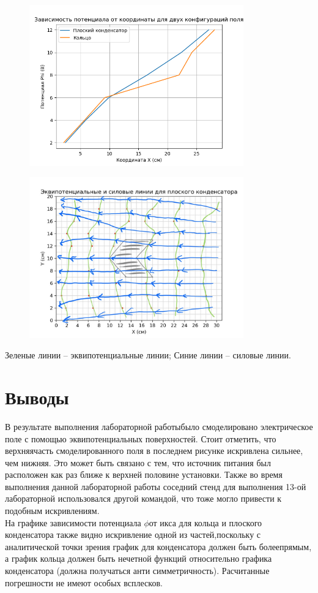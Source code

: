 \documentclass{article}%
\begin{document}
\begin{figure}[h!]%
\centering%
\includegraphics[width=350px]{2_potentials.png}%
\newpage%
\end{figure}

%


\begin{figure}[h!]%
\centering%
\includegraphics[width=350px]{potential_field.jpg}%
\end{figure}

%
Зеленые линии – эквипотенциальные линии; Синие линии – силовые линии.%
\newline%
\section{Выводы}%
\label{sec:}%

%
В результате выполнения лабораторной работыбыло смоделировано электрическое поле с помощью эквипотенциальных поверхностей. Стоит отметить, что верхняячасть смоделированного поля в последнем рисунке искривлена сильнее, чем нижняя. Это может быть связано с тем, что источник питания был расположен как раз ближе к верхней половине установки. Также во время выполнения данной лабораторной работы соседний стенд для выполнения 13-ой лабораторной использовался другой командой, что тоже могло привести к подобным искривлениям. \\ На графике зависимости потенциала $\phi$от икса для кольца и плоского конденсатора также видно искривление одной из частей,поскольку с аналитической точки зрения график для конденсатора должен быть болеепрямым, а график кольца должен быть нечетной функций относительно графика конденсатора (должна получаться анти симметричность). Расчитанные погрешности не имеют особых всплесков.%
\newline%
\end{document}
